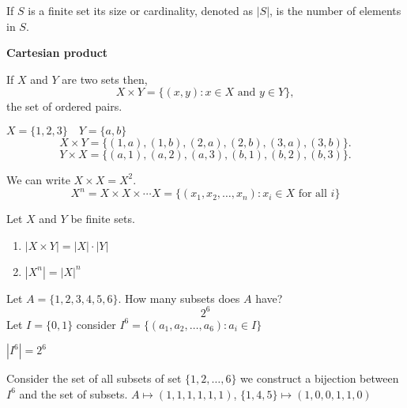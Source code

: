 \documentclass[10pt, a4paper]{article}
\begin{document}
If $S$ is a finite set its size or cardinality, denoted as $|S|$, is the number of elements in $S$.

\textbf{Cartesian product}

If $X$ and $Y$ are two sets then, 
\[
X \times Y = \{(x, y) : x \in X \text{ and } y \in Y\},
\]
the set of ordered pairs.

\begin{example}
    $X = \{1, 2, 3\}\quad Y = \{a, b\}$
    \[
    X \times Y = \{(1, a), (1, b), (2, a), (2, b), (3, a), (3, b)\}.
    \]
    \[
    Y \times X = \{(a, 1), (a, 2), (a, 3), (b, 1), (b, 2), (b, 3)\}.
    \]
\end{example}
We can write $X \times X = X ^ 2$.
\[
X ^ n = X \times X \times \dotsi X = \{(x_1, x_2, \dots, x_n) : x_i \in X \text{ for all } i\}
\]

\begin{proposition}
    Let $X$ and $Y$ be finite sets.
    \begin{enumerate}[label = (\alph*)]
        \item $|X \times Y| = |X|\cdot|Y|$
        \item $|X ^ n| = |X| ^ n$
    \end{enumerate}
\end{proposition}

\begin{example}
    Let $A = \{1, 2, 3, 4, 5, 6\}$. How many subsets does $A$ have?
    \[
    2 ^ 6
    \]
    Let $I = \{0, 1\}$ consider $I ^ 6 = \{(a_1, a_2, \dots, a_6) : a_i \in I\}$

    $|I ^ 6| = 2 ^ 6$
    
    Consider the set of all subsets of set $\{1, 2, \dots, 6\}$ we construct a bijection between $I ^ 6$ and the set of subsets. $A \mapsto (1, 1, 1, 1, 1, 1)$, $\{1, 4, 5\} \mapsto (1, 0, 0, 1, 1, 0)$
\end{example}
\end{document}
